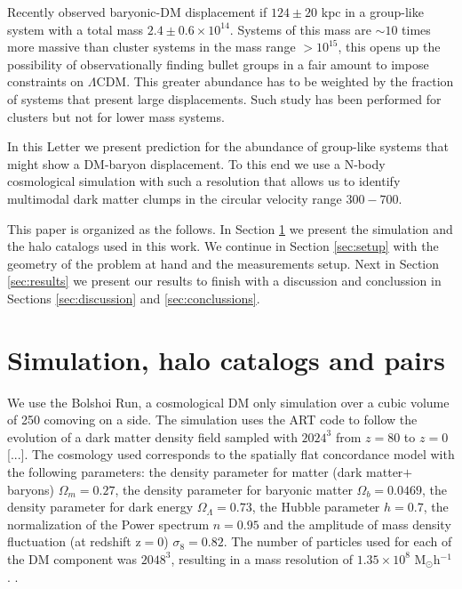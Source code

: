 \documentclass{emulateapj}
\newcommand{\hMpc}{{\ifmmode{h^{-1}{\rm Mpc}}\else{$h^{-1}$Mpc }\fi}}
\newcommand{\hMsun}{{\ifmmode{h^{-1}{\rm {M_{\odot}}}}\else{$h^{-1}{\rm{M_{\odot}}}$}\fi}}
\newcommand{\Msun}{{\ifmmode{{\rm {M_{\odot}}}}\else{${\rm{M_{\odot}}}$}\fi}}
\newcommand{\kms}{{\ifmmode{{\mathrm{\,km\ s}^{-1}}}\else{\,km~s$^{-1}$}\fi}}
\begin{document}
Recently \citep{Gastaldello} observed baryonic-DM displacement if
$124\pm 20$ kpc in a group-like system with a total mass $2.4\pm 0.6
\times 10^{14}$\Msun. Systems of this mass are $\sim 10$ times more massive
than cluster systems in the mass range $>10^{15}$\hMsun, this opens
up the possibility of observationally finding bullet groups in a fair
amount to impose constraints on $\Lambda$CDM. This greater abundance
has to be weighted by the fraction of systems that present large
displacements. Such study has been performed for clusters but not for
lower mass systems.

In this Letter we present prediction for the abundance of group-like
systems that might show a DM-baryon displacement. To this end we use a
N-body cosmological simulation with such a resolution that allows us
to identify multimodal dark matter clumps in the circular velocity
range $300-700$\kms. 

This paper is organized as the follows. In Section
\ref{sec:simulation} we present the simulation and the halo catalogs
used in this work. We continue in Section \ref{sec:setup} with the
geometry of the problem at hand and the measurements setup. Next in
Section \ref{sec:results} we present our results to finish with a
discussion and conclussion in Sections \ref{sec:discussion} and
\ref{sec:conclussions}. 


\section{Simulation, halo catalogs and pairs}
\label{sec:simulation}

We use the Bolshoi Run, a cosmological DM only simulation over a cubic
volume of 250 comoving \hMpc on a side. The simulation uses the ART code to
follow the evolution of  a dark matter density field sampled with
$2024^3$ from $z=80$ to $z=0$ [...]. The cosmology used  corresponds
to  the spatially flat concordance model with the following
parameters:  the density parameter for matter (dark matter$+$baryons)
$\Omega_m=0.27$, the density parameter for baryonic matter
$\Omega_b=0.0469$, the density parameter for dark energy
$\Omega_{\Lambda}=0.73$, the Hubble parameter $h=0.7$, the
normalization of the Power spectrum $n=0.95$ and the amplitude of mass
density fluctuation (at redshift z$=$0) $\sigma_8=0.82$.  The number
of particles used for each of the DM component was $2048^3$, resulting
in a mass resolution of $1.35 \times 10^8$
M$_{\odot}$h$^{-1}$. \citet{2011ApJ...740..102K}.  
\end{document}
